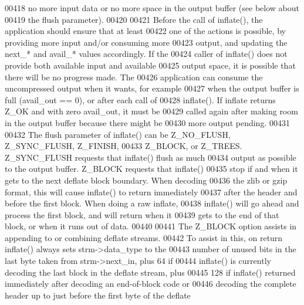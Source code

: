 \begin{DoxyCode}
00418 \textcolor{comment}{    no more input data or no more space in the output buffer (see below about}
00419 \textcolor{comment}{    the flush parameter).}
00420 \textcolor{comment}{}
00421 \textcolor{comment}{    Before the call of inflate(), the application should ensure that at least}
00422 \textcolor{comment}{  one of the actions is possible, by providing more input and/or consuming more}
00423 \textcolor{comment}{  output, and updating the next\_* and avail\_* values accordingly.  If the}
00424 \textcolor{comment}{  caller of inflate() does not provide both available input and available}
00425 \textcolor{comment}{  output space, it is possible that there will be no progress made.  The}
00426 \textcolor{comment}{  application can consume the uncompressed output when it wants, for example}
00427 \textcolor{comment}{  when the output buffer is full (avail\_out == 0), or after each call of}
00428 \textcolor{comment}{  inflate().  If inflate returns Z\_OK and with zero avail\_out, it must be}
00429 \textcolor{comment}{  called again after making room in the output buffer because there might be}
00430 \textcolor{comment}{  more output pending.}
00431 \textcolor{comment}{}
00432 \textcolor{comment}{    The flush parameter of inflate() can be Z\_NO\_FLUSH, Z\_SYNC\_FLUSH, Z\_FINISH,}
00433 \textcolor{comment}{  Z\_BLOCK, or Z\_TREES.  Z\_SYNC\_FLUSH requests that inflate() flush as much}
00434 \textcolor{comment}{  output as possible to the output buffer.  Z\_BLOCK requests that inflate()}
00435 \textcolor{comment}{  stop if and when it gets to the next deflate block boundary.  When decoding}
00436 \textcolor{comment}{  the zlib or gzip format, this will cause inflate() to return immediately}
00437 \textcolor{comment}{  after the header and before the first block.  When doing a raw inflate,}
00438 \textcolor{comment}{  inflate() will go ahead and process the first block, and will return when it}
00439 \textcolor{comment}{  gets to the end of that block, or when it runs out of data.}
00440 \textcolor{comment}{}
00441 \textcolor{comment}{    The Z\_BLOCK option assists in appending to or combining deflate streams.}
00442 \textcolor{comment}{  To assist in this, on return inflate() always sets strm->data\_type to the}
00443 \textcolor{comment}{  number of unused bits in the last byte taken from strm->next\_in, plus 64 if}
00444 \textcolor{comment}{  inflate() is currently decoding the last block in the deflate stream, plus}
00445 \textcolor{comment}{  128 if inflate() returned immediately after decoding an end-of-block code or}
00446 \textcolor{comment}{  decoding the complete header up to just before the first byte of the deflate}

\end{DoxyCode}
